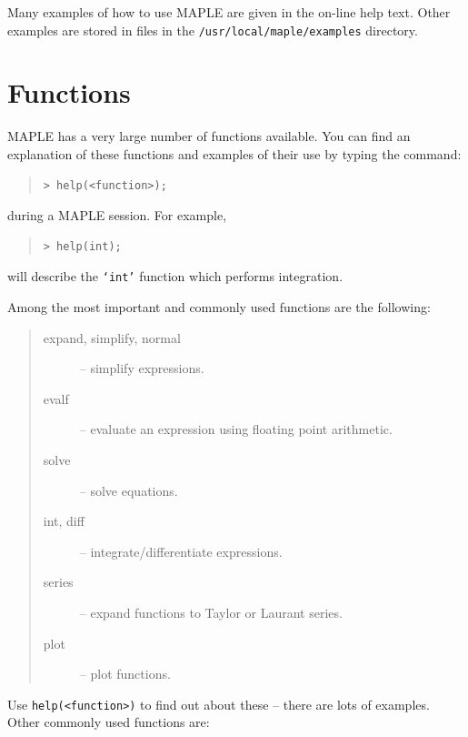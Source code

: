 \documentclass[twoside,11pt]{article}
\newcommand{\xlabel}[1]{}
\begin{document}
Many examples of how to use MAPLE are given in the on-line help text.
Other examples are stored in files in the \texttt{/usr/local/maple/examples} 
directory.

\section{Functions\xlabel{functions}}

MAPLE has a very large number of functions available. You can find an
explanation of these functions and examples of their use by typing the
command:

\begin{quote}\begin{verbatim}
> help(<function>);
\end{verbatim}\end{quote}

during a MAPLE session. For example,

\begin{quote}\begin{verbatim}
> help(int);
\end{verbatim}\end{quote}

will describe the \texttt{`int'} function which performs integration.

Among the most important and commonly used functions are the following:

\begin{quote}
\begin{description}

\item [expand, simplify, normal] -- simplify expressions.
\item [evalf] -- evaluate an expression using floating point arithmetic.
\item [solve] -- solve equations.
\item [int, diff] -- integrate/differentiate expressions.
\item [series] -- expand functions to Taylor or Laurant series.
\item [plot] -- plot functions.

\end{description}
\end{quote}

Use \verb+help(<function>)+ to find out about these -- there are lots of
examples. Other commonly used functions are:
\end{document}
